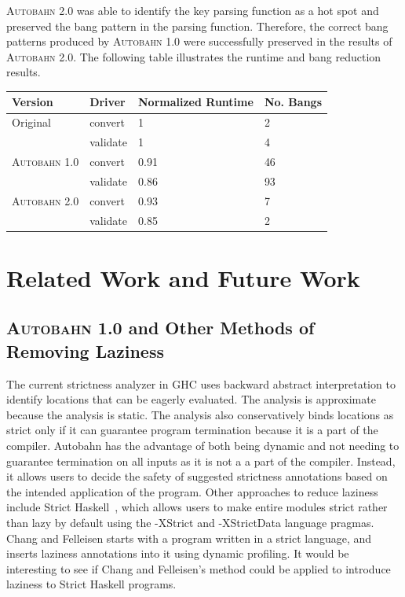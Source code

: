 \documentclass[format=sigplan, review=true]{acmart}
\newcommand{\hotspot}[0]{hot spot}
\newcommand{\Ao}[0]{\textsc{Autobahn 1.0}}
\newcommand{\At}[0]{\textsc{Autobahn 2.0}}
\begin{document}
\At{} was able to identify the key parsing function as a \hotspot{} and preserved the bang pattern in the parsing function. Therefore, the correct bang patterns produced by \Ao{} were successfully preserved in the results of \At{}. The following table illustrates the runtime and bang reduction results. 

\begin{tabular}{p{2.5cm}p{1cm}p{1.5cm}p{1.5cm}}
\hline
Version   & Driver & Normalized Runtime & No. Bangs\\
\hline
Original      & convert   & 1     & 2 \\
          & validate        & 1     &  4\\
\Ao{}       & convert     & 0.91     & 46\\
          & validate        & 0.86	& 93\\
\At{}       & convert     & 0.93     &   7 \\
          & validate        & 0.85 & 2	\\
\hline
\end{tabular}

\section{Related Work and Future Work}

\subsection{\Ao{} and Other Methods of Removing Laziness}

The current strictness analyzer in GHC uses backward abstract
interpretation to identify locations that can be eagerly
evaluated. The analysis is approximate because the analysis is
static. The analysis also conservatively binds locations as strict
only if it can guarantee program termination because it is a part of
the compiler. Autobahn has the advantage of both being dynamic and not
needing to guarantee termination on all inputs as it is not a a part
of the compiler. Instead, it allows users to decide the safety of
suggested strictness annotations based on the intended application of
the program. Other approaches to reduce laziness include Strict
Haskell~\cite{strict-haskell}, which allows users to make entire modules strict rather than
lazy by default using the -XStrict and -XStrictData language
pragmas. Chang and Felleisen starts with a program written in a strict
language, and inserts laziness annotations into it using dynamic
profiling. It would be interesting to see if Chang and Felleisen's
method could be applied to introduce laziness to Strict Haskell
programs.
\end{document}

